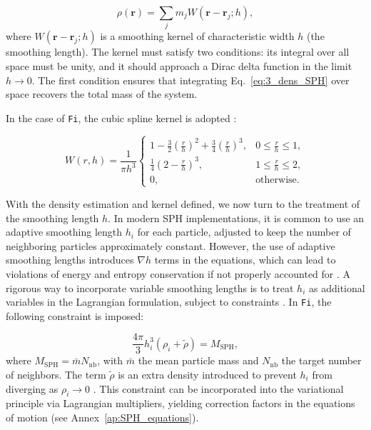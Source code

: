 \begin{equation}
	\rho(\mathbf{r}) = \sum_{j} m_j W(\mathbf{r} - \mathbf{r}_j; h),
	\label{eq:3_dens_SPH}
\end{equation}
where $W(\mathbf{r} - \mathbf{r}_j; h)$ is a smoothing kernel of characteristic width $h$ (the smoothing length). The kernel must satisfy two conditions: its integral over all space must be unity, and it should approach a Dirac delta function in the limit $h \to 0$. The first condition ensures that integrating Eq.~\eqref{eq:3_dens_SPH} over space recovers the total mass of the system.


In the case of \texttt{Fi}, the cubic spline kernel is adopted \citep{pelupessy2005numerical,monaghan1992smoothed}:

\begin{equation}
	W(r,h) = \frac{1}{\pi h^3}
	\begin{cases}
		1 - \frac{3}{2}\left(\frac{r}{h}\right)^2 + \frac{3}{4}\left(\frac{r}{h}\right)^3, & 0 \leq \frac{r}{h} \leq 1, \\[2ex]
		\frac{1}{4}\left(2 - \frac{r}{h}\right)^3, & 1 \leq \frac{r}{h} \leq 2, \\[2ex]
		0, & \text{otherwise}.
	\end{cases}
	\label{eq:monaghan_lattanzio_kernel}
\end{equation}

With the density estimation and kernel defined, we now turn to the treatment of the smoothing length $h$. In modern SPH implementations, it is common to use an adaptive smoothing length $h_i$ for each particle, adjusted to keep the number of neighboring particles approximately constant. However, the use of adaptive smoothing lengths introduces $\nabla h$ terms in the equations, which can lead to violations of energy and entropy conservation if not properly accounted for \citep{nelson1994variable}. A rigorous way to incorporate variable smoothing lengths is to treat $h_i$ as additional variables in the Lagrangian formulation, subject to constraints \citep{springel2002cosmological}. In \texttt{Fi}, the following constraint is imposed:

\begin{equation}
	\frac{4\pi}{3} h_i^3 (\rho_i + \tilde{\rho}) = M_{\mathrm{SPH}},
	\label{eq:3_sph_h_constraint}
\end{equation}
where $M_{\mathrm{SPH}} = \bar{m} N_{\mathrm{nb}}$, with $\bar{m}$ the mean particle mass and $N_{\mathrm{nb}}$ the target number of neighbors. The term $\tilde{\rho}$ is an extra density introduced to prevent $h_i$ from diverging as $\rho_i \to 0$ \citep{pelupessy2005numerical}. This constraint can be incorporated into the variational principle via Lagrangian multipliers, yielding correction factors in the equations of motion (see Annex~\ref{ap:SPH_equations}).

